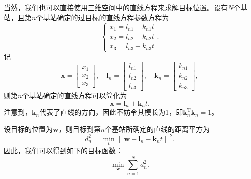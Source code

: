 当然，我们也可以直接使用三维空间中的直线方程来求解目标位置。设有\( N \)个基站，且第\( n \)个基站确定的过目标的直线方程参数方程为
\[
    \begin{cases}
        x_1 = l_{n1} + k_{n1} t \\
        x_2 = l_{n2} + k_{n2} t \\
        x_3 = l_{n3} + k_{n3} t
    \end{cases}.
\]
记
\[
    \bm{x} =
    \begin{bmatrix}
        x_1 \\
        x_2 \\
        x_3
    \end{bmatrix}, \quad
    \bm{l}_n =
    \begin{bmatrix}
        l_{n1} \\
        l_{n2} \\
        l_{n3}
    \end{bmatrix}, \quad
    \bm{k}_n =
    \begin{bmatrix}
        k_{n1} \\
        k_{n2} \\
        k_{n3}
    \end{bmatrix},
\]
则第\( n \)个基站确定的直线方程可以简化为
\[
    \bm{x} = \bm{l}_n + \bm{k}_n t.
\]
注意到，\( \bm{k}_n \)代表了直线的方向，因此不妨令其模长为1，即\(\bm{k}_n^{\mathrm{T}}\bm{k}_n = 1 \)。

设目标的位置为\( \bm{w} \)，则目标到第\( n \)个基站所确定的直线的距离平方为
\[
    d_n^2 = \min_{t} \left\| \bm{w} - \bm{l}_n - \bm{k}_n t \right\|^2.
\]
因此，我们可以得到如下的目标函数：
\[
    \min_{\bm{w}} \sum_{n=1}^{N} d_n^2.
\]

